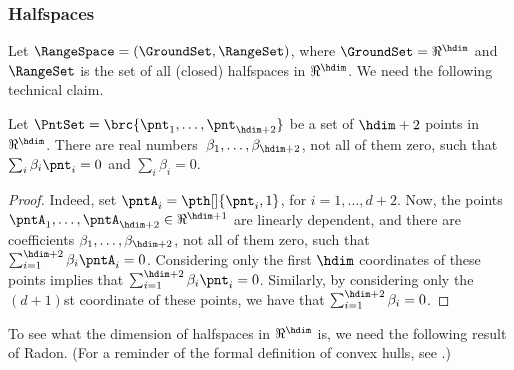 \subsubsection{Halfspaces}
Let $\RangeSpace = (\GroundSet,\RangeSet)$, where
$\GroundSet=\Re^\hdim$ and $\RangeSet$ is the set of all (closed)
halfspaces in $\Re^\hdim$.  We need the following technical claim.

\begin{claim}
    Let $\PntSet = \brc{\pnt_1, \ldots, \pnt_{\hdim+2}}$ be a set of
    $\hdim+2$ points in $\Re^\hdim$.  There are real numbers
    $\;\beta_1, \ldots, \beta_{\hdim+2}$, not all of them zero, such
    that $\sum_i \beta_i \pnt_i = 0$ and $\sum_i \beta_i = 0$.
\end{claim}

\begin{proof} %
    Indeed, set $\pntA_i = \pth[]{\pnt_i, 1}$, for $i=1,\ldots,
    d+2$. Now, the points $\pntA_1, \ldots, \pntA_{\hdim+2} \in
    \Re^{\hdim+1}$ are linearly dependent, and there are coefficients
    $\beta_1, \ldots, \beta_{\hdim+2}$, not all of them zero, such
    that $\sum_{i=1}^{\hdim+2} \beta_i \pntA_i = 0$.  Considering only
    the first $\hdim$ coordinates of these points implies that
    $\sum_{i=1}^{\hdim+2} \beta_i \pnt_i = 0$. Similarly, by
    considering only the $(d+1)$st coordinate of these points, we have
    that $\sum_{i=1}^{\hdim+2} \beta_i = 0$.
\end{proof}


To see what the \VC dimension of halfspaces in $\Re^\hdim$ is, we need
the following result of Radon. (For a reminder of the formal
definition of convex hulls, see .)

